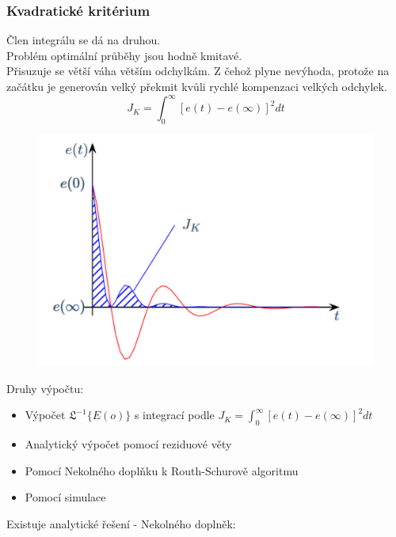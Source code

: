 \subsubsection*{Kvadratické kritérium}
Člen integrálu se dá na druhou.\\
Problém optimální průběhy jsou hodně kmitavé.\\
Přisuzuje se větší váha větším odchylkám. Z čehož plyne nevýhoda, protože na začátku je generován velký překmit kvůli rychlé kompenzaci velkých odchylek.\\
\begin{equation}
    J_K = \int^\infty_0[e(t) - e(\infty)]^2dt
\end{equation}
\begin{figure}[H]
    \includegraphics*[scale = 0.3]{images/kvadratickeKriterium.png}
\end{figure}
Druhy výpočtu:
\begin{itemize}
    \item Výpočet \(\mathfrak{L}^{-1}\{E(o)\}\) s integrací podle \(J_K = \int^\infty_0[e(t) - e(\infty)]^2dt\)
    \item Analytický výpočet pomocí reziduové věty
    \item Pomocí Nekolného doplňku k Routh-Schurově algoritmu
    \item Pomocí simulace
\end{itemize}
Existuje analytické řešení - Nekolného doplněk:
